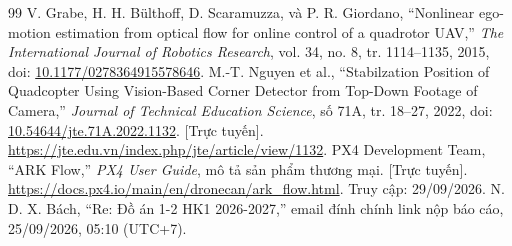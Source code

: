 \documentclass[a4paper,12pt]{article}
\begin{document}
\begin{thebibliography}{99}
 V. Grabe, H. H. Bülthoff, D. Scaramuzza, và P. R. Giordano, “Nonlinear ego-motion estimation from optical flow for online control of a quadrotor UAV,” \textit{The International Journal of Robotics Research}, vol. 34, no. 8, tr. 1114–1135, 2015, doi: \href{https://doi.org/10.1177/0278364915578646}{10.1177/0278364915578646}.
 M.-T. Nguyen et al., “Stabilzation Position of Quadcopter Using Vision-Based Corner Detector from Top-Down Footage of Camera,” \textit{Journal of Technical Education Science}, số 71A, tr. 18–27, 2022, doi: \href{https://doi.org/10.54644/jte.71A.2022.1132}{10.54644/jte.71A.2022.1132}. [Trực tuyến]. \url{https://jte.edu.vn/index.php/jte/article/view/1132}.
 PX4 Development Team, “ARK Flow,” \textit{PX4 User Guide}, mô tả sản phẩm thương mại. [Trực tuyến]. \url{https://docs.px4.io/main/en/dronecan/ark_flow.html}. Truy cập: 29/09/2026.
 N. D. X. Bách, “Re: Đồ án 1-2 HK1 2026-2027,” email đính chính link nộp báo cáo, 25/09/2026, 05:10 (UTC+7).
\end{thebibliography}
\endgroup
\end{document}
